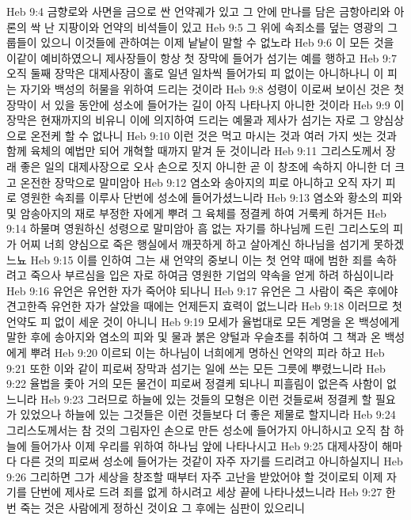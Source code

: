 Heb 9:4  금향로와 사면을 금으로 싼 언약궤가 있고 그 안에 만나를 담은 금항아리와 아론의 싹 난 지팡이와 언약의 비석들이 있고
Heb 9:5  그 위에 속죄소를 덮는 영광의 그룹들이 있으니 이것들에 관하여는 이제 낱낱이 말할 수 없노라
Heb 9:6  이 모든 것을 이같이 예비하였으니 제사장들이 항상 첫 장막에 들어가 섬기는 예를 행하고
Heb 9:7  오직 둘째 장막은 대제사장이 홀로 일년 일차씩 들어가되 피 없이는 아니하나니 이 피는 자기와 백성의 허물을 위하여 드리는 것이라
Heb 9:8  성령이 이로써 보이신 것은 첫장막이 서 있을 동안에 성소에 들어가는 길이 아직 나타나지 아니한 것이라
Heb 9:9  이 장막은 현재까지의 비유니 이에 의지하여 드리는 예물과 제사가 섬기는 자로 그 양심상으로 온전케 할 수 없나니
Heb 9:10  이런 것은 먹고 마시는 것과 여러 가지 씻는 것과 함께 육체의 예법만 되어 개혁할 때까지 맡겨 둔 것이니라
Heb 9:11  그리스도께서 장래 좋은 일의 대제사장으로 오사 손으로 짓지 아니한 곧 이 창조에 속하지 아니한 더 크고 온전한 장막으로 말미암아
Heb 9:12  염소와 송아지의 피로 아니하고 오직 자기 피로 영원한 속죄를 이루사 단번에 성소에 들어가셨느니라
Heb 9:13  염소와 황소의 피와 및 암송아지의 재로 부정한 자에게 뿌려 그 육체를 정결케 하여 거룩케 하거든
Heb 9:14  하물며 영원하신 성령으로 말미암아 흠 없는 자기를 하나님께 드린 그리스도의 피가 어찌 너희 양심으로 죽은 행실에서 깨끗하게 하고 살아계신 하나님을 섬기게 못하겠느뇨
Heb 9:15  이를 인하여 그는 새 언약의 중보니 이는 첫 언약 때에 범한 죄를 속하려고 죽으사 부르심을 입은 자로 하여금 영원한 기업의 약속을 얻게 하려 하심이니라
Heb 9:16  유언은 유언한 자가 죽어야 되나니
Heb 9:17  유언은 그 사람이 죽은 후에야 견고한즉 유언한 자가 살았을 때에는 언제든지 효력이 없느니라
Heb 9:18  이러므로 첫 언약도 피 없이 세운 것이 아니니
Heb 9:19  모세가 율법대로 모든 계명을 온 백성에게 말한 후에 송아지와 염소의 피와 및 물과 붉은 양털과 우슬초를 취하여 그 책과 온 백성에게 뿌려
Heb 9:20  이르되 이는 하나님이 너희에게 명하신 언약의 피라 하고
Heb 9:21  또한 이와 같이 피로써 장막과 섬기는 일에 쓰는 모든 그릇에 뿌렸느니라
Heb 9:22  율법을 좇아 거의 모든 물건이 피로써 정결케 되나니 피흘림이 없은즉 사함이 없느니라
Heb 9:23  그러므로 하늘에 있는 것들의 모형은 이런 것들로써 정결케 할 필요가 있었으나 하늘에 있는 그것들은 이런 것들보다 더 좋은 제물로 할지니라
Heb 9:24  그리스도께서는 참 것의 그림자인 손으로 만든 성소에 들어가지 아니하시고 오직 참 하늘에 들어가사 이제 우리를 위하여 하나님 앞에 나타나시고
Heb 9:25  대제사장이 해마다 다른 것의 피로써 성소에 들어가는 것같이 자주 자기를 드리려고 아니하실지니
Heb 9:26  그리하면 그가 세상을 창조할 때부터 자주 고난을 받았어야 할 것이로되 이제 자기를 단번에 제사로 드려 죄를 없게 하시려고 세상 끝에 나타나셨느니라
Heb 9:27  한번 죽는 것은 사람에게 정하신 것이요 그 후에는 심판이 있으리니
